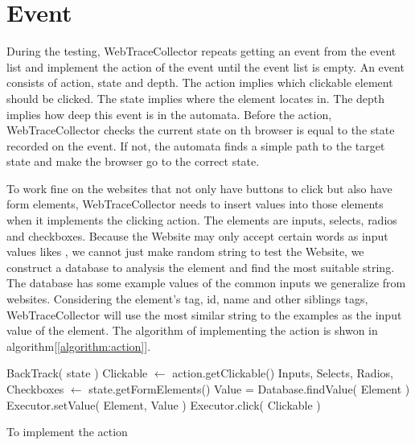 \clearpage

\section{Event}

During the testing, WebTraceCollector repeats getting an event from the event list and implement the action of the event until the event list is empty.
An event consists of action, state and depth.
The action implies which clickable element should be clicked.
The state implies where the element locates in.
The depth implies how deep this event is in the automata.
Before the action, WebTraceCollector checks the current state on th browser is equal to the state recorded on the event.
If not, the automata finds a simple path to the target state and make the browser go to the correct state.

To work fine on the websites that not only have buttons to click but also have form elements,
WebTraceCollector needs to insert values into those elements when it implements the clicking action.
The elements are inputs, selects, radios and checkboxes.
Because the Website may only accept certain words as input values likes , we cannot just make random string to test the Website,
we construct a database to analysis the element and find the most suitable string.
The database has some example values of the common inputs we generalize from websites.
Considering the element's tag, id, name and other siblings tags,
WebTraceCollector will use the most similar string to the examples as the input value of the element.
The algorithm of implementing the action is shwon in algorithm[\ref{algorithm:action}].


\begin{algorithm}[htb]
	\begin{doublespace}		
		{
			BackTrack( state )\;
		}
		Clickable $\gets$ action.getClickable()\;
		Inputs, Selects, Radios, Checkboxes $\gets$ state.getFormElements()\;
		{
			Value = Database.findValue( Element )\;
			Executor.setValue( Element, Value )\;
		}
		Executor.click( Clickable )\;
		
	\end{doublespace}
	\caption{To implement the action}
	\label{algorithm:action}
\end{algorithm} 

